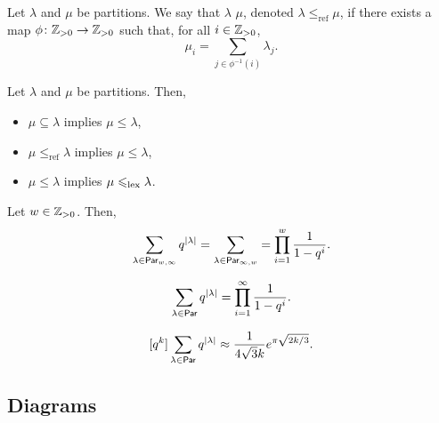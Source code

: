 \newcommand\refines{\leq_{\mathrm{ref}}}

\begin{definition}
    Let \(\lambda\) and \(\mu\) be partitions.
    We say that \(\lambda\)  \(\mu\),
    denoted \(\lambda \refines \mu\),
    if there exists a map \(\phi \colon \mathbb{Z}_{> 0} \to \mathbb{Z}_{> 0}\) such that, for all \(i \in \mathbb{Z}_{> 0}\),
    \[
        \mu_i = \sum_{j \in \phi^{-1}(i)} \lambda_j.
    \]
\end{definition}

\begin{proposition}
    Let \(\lambda\) and \(\mu\) be partitions.
    Then,
    \begin{itemize}
        \item \(\mu \subseteq \lambda\) implies \(\mu \leq \lambda\),
        \item \(\mu \refines \lambda\) implies \(\mu \leq \lambda\),
        \item \(\mu \leq \lambda\) implies \(\mu \leqslant_{\mathrm{lex}} \lambda\).
    \end{itemize}
\end{proposition}

\begin{theorem}
    Let \(w \in \mathbb{Z}_{> 0}\).
    Then,
    \[
        \sum_{\lambda \in \operatorname{\mathsf{Par}}_{w, \infty}} q^{|\lambda|}
        = \sum_{\lambda \in \operatorname{\mathsf{Par}}_{\infty, w}}
        = \prod_{i=1}^{w} \frac{1}{1 - q^i}.
    \]
\end{theorem}

\begin{corollary}
    \[
        \sum_{\lambda \in \operatorname{\mathsf{Par}}} q^{|\lambda|}
        = \prod_{i=1}^{\infty} \frac{1}{1 - q^i}.
    \]
\end{corollary}

\begin{theorem}
    \[
        [q^k] \sum_{\lambda \in \operatorname{\mathsf{Par}}} q^{|\lambda|}
        \approx \frac{1}{4 \sqrt{3} k} e^{\pi \sqrt{2k/3}}.
    \]
\end{theorem}

\subsection{Diagrams} \label{subsec:diagrams}

